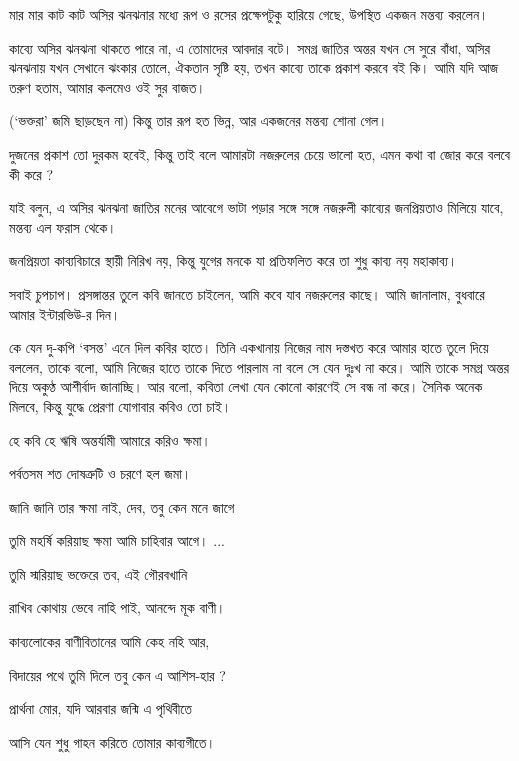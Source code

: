 \documentclass[a4paper,11pt]{article}
\begin{document}
\begin{multicols}{2}
{\begin{spacing}{1.15}
মার মার কাট কাট অসির ঝনঝনার মধ্যে রূপ ও রসের প্রক্ষেপটুকু হারিয়ে গেছে, উপস্থিত একজন মন্তব্য করলেন।

কাব্যে অসির ঝনঝনা থাকতে পারে না, এ তোমাদের আবদার বটে। সমগ্র জাতির অন্তর যখন সে সুরে বাঁধা, অসির ঝনঝনায় যখন সেখানে ঝংকার তোলে, ঐকতান সৃষ্টি হয়, তখন কাব্যে তাকে প্রকাশ করবে বই কি।  আমি যদি আজ তরুণ হতাম, আমার কলমেও ওই সুর বাজত।

(‘ভক্তরা’ জমি ছাড়ছেন না) কিন্তু তার রূপ হত ভিন্ন, আর একজনের মন্তব্য শোনা গেল।  

দুজনের প্রকাশ তো দুরকম হবেই, কিন্তু তাই বলে আমারটা নজরুলের চেয়ে ভালো হত, এমন কথা বা জোর করে বলবে কী করে ?

যাই বলুন, এ অসির ঝনঝনা জাতির মনের আবেগে ভাটা পড়ার সঙ্গে সঙ্গে নজরুলী কাব্যের জনপ্রিয়তাও মিলিয়ে যাবে, মন্তব্য এল ফরাস থেকে। 

জনপ্রিয়তা কাব্যবিচারে স্থায়ী নিরিখ নয়, কিন্তু যুগের মনকে যা প্রতিফলিত করে তা শুধু কাব্য নয় মহাকাব্য।

সবাই চুপচাপ।  প্রসঙ্গান্তর তুলে কবি জানতে চাইলেন, আমি কবে যাব নজরুলের কাছে।  আমি জানালাম, বুধবারে আমার ইন্টারভিউ-র দিন।

কে যেন দু-কপি ‘বসন্ত’ এনে দিল কবির হাতে।  তিনি একখানায় নিজের নাম দস্তখত করে আমার হাতে তুলে দিয়ে বললেন, তাকে বলো, আমি নিজের হাতে তাকে দিতে পারলাম না বলে সে যেন দুঃখ না করে।  আমি তাকে সমগ্র অন্তর দিয়ে অকুণ্ঠ আশীর্বাদ জানাচ্ছি। আর বলো, কবিতা লেখা যেন কোনো কারণেই সে বন্ধ না করে।  সৈনিক অনেক মিলবে, কিন্তু যুদ্ধে প্রেরণা যোগাবার কবিও তো চাই।
\end{spacing}
\closearticle

\begin{spacing}{1.15}\obeylines
\bn হে কবি হে ঋষি অন্তর্যামী আমারে করিও ক্ষমা।

পর্বতসম শত দোষত্রুটি ও চরণে হল জমা।

জানি জানি তার ক্ষমা নাই, দেব, তবু কেন মনে জাগে

তুমি মহর্ষি করিয়াছ ক্ষমা আমি চাহিবার আগে। ...

তুমি স্মরিয়াছ ভক্তেরে তব, এই গৌরবখানি

রাখিব কোথায় ভেবে নাহি পাই, আনন্দে মূক বাণী।

কাব্যলোকের বাণীবিতানের আমি কেহ নহি আর,

বিদায়ের পথে তুমি দিলে তবু কেন এ আশিস-হার ?

প্রার্থনা মোর, যদি আরবার জন্মি এ পৃথিবীতে

আসি যেন শুধু গাহন করিতে তোমার কাব্যগীতে।

\end{spacing}
\closearticle}
\end{multicols}
\end{document}

